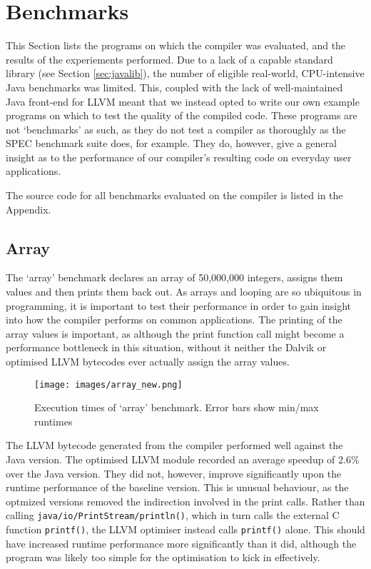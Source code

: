 \section{Benchmarks}
\label{sec:benchmarks}

This Section lists the programs on which the compiler was evaluated, and the results of the experiements performed. Due to a lack of a capable standard library (see Section \ref{sec:javalib}), the number of eligible real-world, CPU-intensive Java benchmarks was limited. This, coupled with the lack of well-maintained Java front-end for LLVM meant that we instead opted to write our own example programs on which to test the quality of the compiled code. These programs are not `benchmarks' as such, as they do not test a compiler as thoroughly as the SPEC benchmark suite does, for example. They do, however, give a general insight as to the performance of our compiler's resulting code on everyday user applications.

The source code for all benchmarks evaluated on the compiler is listed in the Appendix.

\subsection*{Array}

The `array' benchmark declares an array of 50,000,000 integers, assigns them values and then prints them back out. As arrays and looping are so ubiquitous in programming, it is important to test their performance in order to gain insight into how the compiler performs on common applications. The printing of the array values is important, as although the print function call might become a performance bottleneck in this situation, without it neither the Dalvik or optimised LLVM bytecodes ever actually assign the array values.

\begin{figure}[h!]
    \centering
    \texttt{[image: images/array\_new.png]}
    \caption[Execution times of `array' benchmark]{Execution times of `array' benchmark. Error bars show min/max runtimes}
    \label{fig:res_array}
\end{figure}

The LLVM bytecode generated from the compiler performed well against the Java version. The optimised LLVM module recorded an average speedup of 2.6\% over the Java version. They did not, however, improve significantly upon the runtime performance of the baseline version. This is unusual behaviour, as the optmized versions removed the indirection involved in the print calls. Rather than calling \verb|java/io/PrintStream/println()|, which in turn calls the external C function \verb|printf()|, the LLVM optimiser instead calls \verb|printf()| alone. This should have increased runtime performance more significantly than it did, although the program was likely too simple for the optimisation to kick in effectively.

